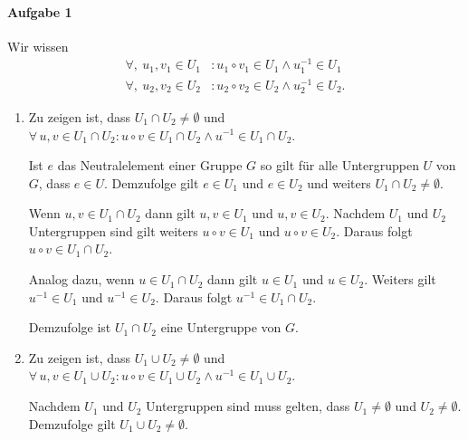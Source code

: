 \documentclass{article}
\begin{document}
\paragraph{Aufgabe 1}

Wir wissen
\begin{align*}
    \forall,\ u_1, v_1 \in U_1 &: u_1 \circ v_1 \in U_1 \land u_1^{-1} \in U_1 \\
    \forall,\ u_2, v_2 \in U_2 &: u_2 \circ v_2 \in U_2 \land u_2^{-1} \in U_2.
\end{align*}

\begin{enumerate}
    \item Zu zeigen ist, dass $U_1 \cap U_2 \neq \emptyset$ und $\forall\, u, v \in U_1 \cap U_2 : u \circ v \in U_1 \cap U_2 \land u^{-1} \in U_1 \cap U_2$.
    
    Ist $e$ das Neutralelement einer Gruppe $G$ so gilt für alle Untergruppen $U$ von $G$, dass $e \in U$. Demzufolge gilt $e \in U_1$ und $e \in U_2$ und weiters $U_1 \cap U_2 \neq \emptyset$.

    Wenn $u, v \in U_1 \cap U_2$ dann gilt $u, v \in U_1$ und $u, v \in U_2$. Nachdem $U_1$ und $U_2$ Untergruppen sind gilt weiters $u \circ v \in U_1$ und $u \circ v \in U_2$. Daraus folgt $u \circ v \in U_1 \cap U_2$.

    Analog dazu, wenn $u \in U_1 \cap U_2$ dann gilt $u \in U_1$ und $u \in U_2$. Weiters gilt $u^{-1} \in U_1$ und $u^{-1} \in U_2$. Daraus folgt $u^{-1} \in U_1 \cap U_2$.

    Demzufolge ist $U_1 \cap U_2$ eine Untergruppe von $G$.

    \item Zu zeigen ist, dass $U_1 \cup U_2 \neq \emptyset$ und $\forall\, u, v \in U_1 \cup U_2 : u \circ v \in U_1 \cup U_2 \land u^{-1} \in U_1 \cup U_2$.

    Nachdem $U_1$ und $U_2$ Untergruppen sind muss gelten, dass $U_1 \neq \emptyset$ und $U_2 \neq \emptyset$. Demzufolge gilt $U_1 \cup U_2 \neq \emptyset$.
        

\end{enumerate}
\end{document}
